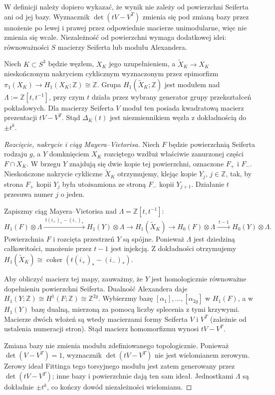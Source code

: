 \begin{uwaga}
W definicji należy dopiero wykazać, że wynik nie zależy
od powierzchni Seiferta ani od jej bazy. Wyznacznik $\det(tV-V^T)$
zmienia się pod zmianą bazy przez mnożenie po lewej i prawej
przez odpowiednie macierze unimodularne, więc nie zmienia
się wcale. Niezależność od powierzchni wymaga dodatkowej idei:
równoważności $S$ macierzy Seiferta lub modułu Alexandera.
\end{uwaga}

\begin{twierdzenie}
Niech $K\subset S^3$ będzie węzłem, $X_K$ jego uzupełnieniem,
a $\widetilde X_K\to X_K$ nieskończonym nakryciem cyklicznym
wyznaczonym przez epimorfizm
$\pi_1(X_K)\to H_1(X_K;\mathbb Z)\cong\mathbb Z$.
Grupa $H_1(\widetilde X_K;\mathbb Z)$ jest modułem nad
$\Lambda:=\mathbb Z[t,t^{-1}]$, przy czym $t$ działa przez
wybrany generator grupy przekształceń pokładowych. Dla
macierzy Seiferta $V$ moduł ten posiada kwadratową macierz
prezentacji $tV-V^T$. Stąd $\Delta_K(t)$ jest niezmiennikiem
węzła z dokładnością do $\pm t^k$.
\end{twierdzenie}

\begin{proof}[Rozcięcie, nakrycie i ciąg Mayera--Vietorisa]
Niech $F$ będzie powierzchnią Seiferta rodzaju $g$, a
$Y$ domknięciem $X_K$ rozciętego wzdłuż właściwie
zanurzonej części $F\cap X_K$. W brzegu $Y$ znajdują się
dwie kopie tej powierzchni, oznaczone $F_+$ i $F_-$.
Nieskończone nakrycie cykliczne $\widetilde X_K$ otrzymujemy,
klejąc kopie $Y_j$, $j\in\mathbb Z$, tak, by strona
$F_+$ kopii $Y_j$ była utożsamiona ze stroną $F_-$
kopii $Y_{j+1}$. Działanie $t$ przesuwa numer $j$ o jeden.

Zapiszmy ciąg Mayera--Vietorisa nad
$\Lambda=\mathbb Z[t,t^{-1}]$:
\[
H_1(F)\otimes\Lambda\xrightarrow{\;t(i_+)_*-(i_-)_*\;}
H_1(Y)\otimes\Lambda\longrightarrow
H_1(\widetilde X_K)\longrightarrow
H_0(F)\otimes\Lambda\xrightarrow{\;t-1\;}
H_0(Y)\otimes\Lambda.
\]
Powierzchnia $F$ i rozcięta przestrzeń $Y$ są spójne.
Ponieważ $\Lambda$ jest dziedziną całkowitości, mnożenie
przez $t-1$ jest injekcją. Z dokładności otrzymujemy
$H_1(\widetilde X_K)\cong\operatorname{coker}
(t(i_+)_*-(i_-)_*)$.

Aby obliczyć macierz tej mapy, zauważmy, że $Y$ jest
homologicznie równoważne dopełnieniu powierzchni Seiferta.
Dualność Alexandera daje
$H_1(Y;\mathbb Z)\cong H^1(F;\mathbb Z)\cong\mathbb Z^{2g}$.
Wybierzmy bazę $[\alpha_1],\dots,[\alpha_{2g}]$ w $H_1(F)$,
a w $H_1(Y)$ bazę dualną, mierzoną za pomocą liczby splecenia
z tymi krzywymi. Macierze dwóch włożeń są wtedy macierzami
formy Seiferta $V$ i $V^T$ (zależnie od ustalenia numeracji
stron). Stąd macierz homomorfizmu wynosi $tV-V^T$.

Zmiana bazy nie zmienia modułu zdefiniowanego topologicznie.
Ponieważ $\det(V-V^T)=1$, wyznacznik $\det(tV-V^T)$
nie jest wielomianem zerowym. Zerowy ideał Fittinga
tego torsyjnego modułu jest zatem generowany przez
$\det(tV-V^T)$; inne bazy i powierzchnie dają ten sam
ideał. Jednostkami $\Lambda$ są dokładnie $\pm t^k$,
co kończy dowód niezależności wielomianu.
\end{proof}

